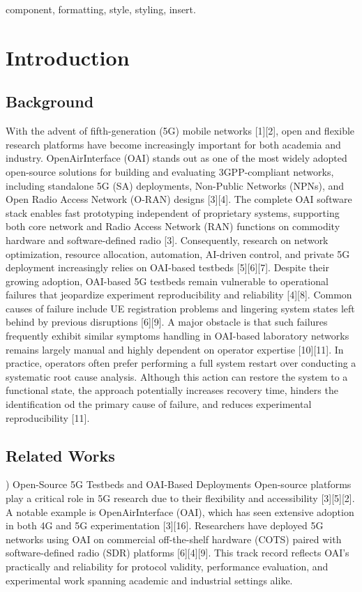 \documentclass[conference]{IEEEtran}
\begin{document}
\begin{IEEEkeywords}
component, formatting, style, styling, insert.
\end{IEEEkeywords}
\section{Introduction}
\subsection{Background}
With the advent of fifth-generation (5G) mobile networks [1][2], open and flexible research platforms have become increasingly important for both academia and industry. OpenAirInterface (OAI) stands out as one of the most widely adopted open-source solutions for building and evaluating 3GPP-compliant networks, including standalone 5G (SA) deployments, Non-Public Networks (NPNs), and Open Radio Access Network (O-RAN) designs [3][4]. The complete OAI software stack enables fast prototyping independent of proprietary systems, supporting both core network and Radio Access Network (RAN) functions on commodity hardware and software-defined radio [3]. Consequently, research on network optimization, resource allocation, automation, AI-driven control, and private 5G deployment increasingly relies on OAI-based testbeds [5][6][7].
Despite their growing adoption, OAI-based 5G testbeds remain vulnerable to operational failures that jeopardize experiment reproducibility and reliability [4][8]. Common causes of failure include UE registration problems and lingering system states left behind by previous disruptions [6][9]. A major obstacle is that such failures frequently exhibit similar symptoms handling in OAI-based laboratory networks remains largely manual and highly dependent on operator expertise [10][11]. In practice, operators often prefer performing a full system restart over conducting a systematic root cause analysis. Although this action can restore the system to a functional state, the approach potentially increases recovery time, hinders the identification od the primary cause of failure, and reduces experimental reproducibility [11].

\subsection{Related Works}
) Open-Source 5G Testbeds and OAI-Based Deployments
Open-source platforms play a critical role in 5G research due to their flexibility and accessibility [3][5][2]. A notable example is OpenAirInterface (OAI), which has seen extensive adoption in both 4G and 5G experimentation [3][16]. Researchers have deployed 5G networks using OAI on commercial off-the-shelf hardware (COTS) paired with software-defined radio (SDR) platforms [6][4][9]. This track record reflects OAI's practically and reliability for protocol validity, performance evaluation, and experimental work spanning academic and industrial settings alike.
\end{document}
